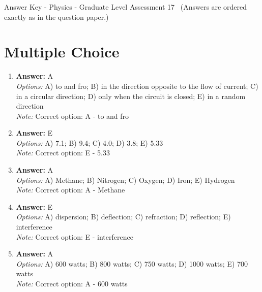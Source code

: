 \documentclass[12pt]{article}
\begin{document}
\begin{center}
Answer Key - Physics - Graduate Level Assessment 17 \
\small (Answers are ordered exactly as in the question paper.)
\end{center}

\section*{Multiple Choice}
\begin{enumerate}[label=\arabic*.]
\item \textbf{Answer:} A
\\ \textit{Options:} A) to and fro; B) in the direction opposite to the flow of current; C) in a circular direction; D) only when the circuit is closed; E) in a random direction
\\ \textit{Note:} Correct option: A - to and fro
\item \textbf{Answer:} E
\\ \textit{Options:} A) 7.1; B) 9.4; C) 4.0; D) 3.8; E) 5.33
\\ \textit{Note:} Correct option: E - 5.33
\item \textbf{Answer:} A
\\ \textit{Options:} A) Methane; B) Nitrogen; C) Oxygen; D) Iron; E) Hydrogen
\\ \textit{Note:} Correct option: A - Methane
\item \textbf{Answer:} E
\\ \textit{Options:} A) dispersion; B) deflection; C) refraction; D) reflection; E) interference
\\ \textit{Note:} Correct option: E - interference
\item \textbf{Answer:} A
\\ \textit{Options:} A) 600 watts; B) 800 watts; C) 750 watts; D) 1000 watts; E) 700 watts
\\ \textit{Note:} Correct option: A - 600 watts
\end{enumerate}
\end{document}
